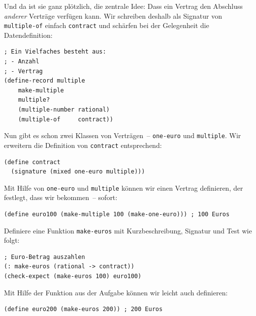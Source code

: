 Und da ist sie ganz plötzlich, die zentrale Idee: Dass ein Vertrag den
Abschluss \emph{anderer} Ver\-träge verfügen kann.  Wir schreiben
deshalb als Signatur von \lstinline{multiple-of} einfach
\lstinline{contract} und schärfen bei der Gelegenheit die Datendefinition:
%
\begin{lstlisting}
; Ein Vielfaches besteht aus:
; - Anzahl
; - Vertrag 
(define-record multiple
    make-multiple
    multiple?
    (multiple-number rational)
    (multiple-of     contract))
\end{lstlisting}
%
Nun gibt es schon zwei Klassen von Verträgen~-- \lstinline{one-euro} und
\lstinline{multiple}.  Wir erweitern die Definition von
\lstinline{contract} entsprechend:
%
\begin{lstlisting}
(define contract
  (signature (mixed one-euro multiple)))
\end{lstlisting}
%
Mit Hilfe von \lstinline{one-euro} und \lstinline{multiple} können wir
einen Vertrag definieren, der festlegt, dass wir  bekommen~--
sofort:
%
\begin{lstlisting}
(define euro100 (make-multiple 100 (make-one-euro))) ; 100 Euros
\end{lstlisting}
%
\begin{aufgabeinline}
  Definiere eine Funktion \lstinline{make-euros} mit Kurzbeschreibung,
  Signatur und Test wie folgt:
\begin{lstlisting}
; Euro-Betrag auszahlen
(: make-euros (rational -> contract))
(check-expect (make-euros 100) euro100)
\end{lstlisting}
\end{aufgabeinline}
%
Mit Hilfe der Funktion aus der Aufgabe können wir leicht auch
 definieren:
%
\begin{lstlisting}
(define euro200 (make-euros 200)) ; 200 Euros
\end{lstlisting}


